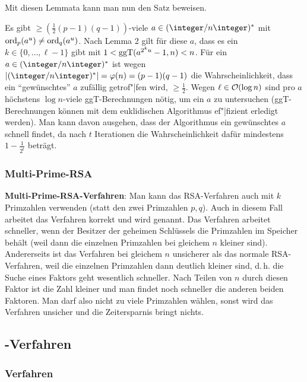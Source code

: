 \linie

Mit diesen Lemmata kann man nun den Satz beweisen.

\begin{Beweis}
    Es gibt $\ge (\frac{1}{2} (p-1)(q-1))$-viele $a \in (\ZnZ)^\ast$ mit
    $\operatorname{ord}_p(a^u) \not= \operatorname{ord}_q(a^u)$.
    Nach Lemma 2 gilt für diese $a$, dass es ein $k \in \{0, \dotsc, \ell - 1\}$ gibt mit
    $1 < \operatorname{ggT}(a^{2^k u} - 1, n) < n$.
    Für ein $a \in (\ZnZ)^\ast$ ist wegen $|(\ZnZ)^\ast| = \varphi(n) = (p-1)(q-1)$
    die Wahrscheinlichkeit, dass ein "`gewünschtes"' $a$ zufällig getrof"|fen wird,
    $\ge \frac{1}{2}$.
    Wegen $\ell \in \mathcal{O}(\log n)$ sind pro $a$ höchstens $\log n$-viele ggT-Berechnungen nötig,
    um ein $a$ zu untersuchen (ggT-Berechnungen können mit dem euklidischen Algorithmus
    ef"|fizient erledigt werden).
    Man kann davon ausgehen, dass der Algorithmus ein gewünschtes $a$ schnell findet,
    da nach $t$ Iterationen die Wahrscheinlichkeit dafür mindestens $1 - \frac{1}{2^t}$
    beträgt.
\end{Beweis}

\subsubsection{%
    Multi-Prime-RSA%
}

\textbf{Multi-Prime-RSA-Verfahren}:
Man kann das RSA-Verfahren auch mit $k$ Primzahlen verwenden (statt den zwei Primzahlen $p, q$).
Auch in diesem Fall arbeitet das Verfahren korrekt
und wird  genannt.
Das Verfahren arbeitet schneller, wenn der Besitzer der geheimen Schlüssels die Primzahlen im
Speicher behält (weil dann die einzelnen Primzahlen bei gleichem $n$ kleiner sind).
Andererseits ist das Verfahren bei gleichem $n$ unsicherer als das normale RSA-Verfahren,
weil die einzelnen Primzahlen dann deutlich kleiner sind,
d.\,h. die Suche eines Faktors geht wesentlich schneller.
Nach Teilen von $n$ durch diesen Faktor ist die Zahl kleiner und man findet noch schneller
die anderen beiden Faktoren.
Man darf also nicht zu viele Primzahlen wählen, sonst wird das Verfahren unsicher und
die Zeitersparnis bringt nichts.

\pagebreak

\subsection{%
    -Verfahren%
}

\subsubsection{%
    Verfahren%
}

